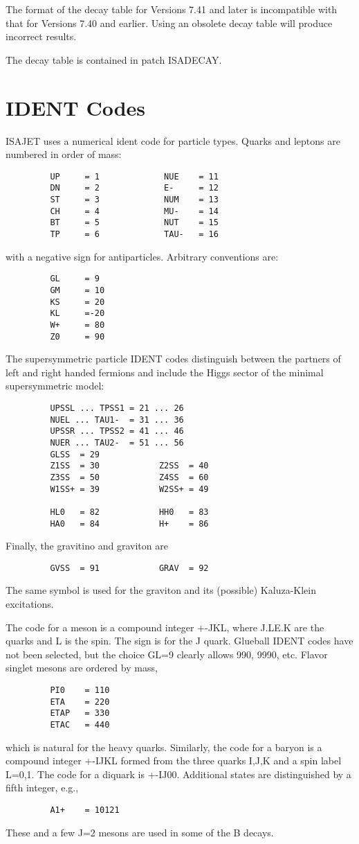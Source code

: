       The format of the decay table for Versions 7.41 and later is
incompatible with that for Versions 7.40 and earlier. Using an
obsolete decay table will produce incorrect results.

      The decay table is contained in patch ISADECAY.
\newpage
\section{IDENT Codes\label{IDENT}}

      ISAJET uses a numerical ident code for particle types. Quarks
and leptons are numbered in order of mass:
\begin{verbatim}
         UP     = 1             NUE    = 11
         DN     = 2             E-     = 12
         ST     = 3             NUM    = 13
         CH     = 4             MU-    = 14
         BT     = 5             NUT    = 15
         TP     = 6             TAU-   = 16
\end{verbatim}
with a negative sign for antiparticles. Arbitrary conventions are:
\begin{verbatim}
         GL     = 9
         GM     = 10
         KS     = 20
         KL     =-20
         W+     = 80
         Z0     = 90
\end{verbatim}
The supersymmetric particle IDENT codes distinguish between the
partners of left and right handed fermions and include the Higgs
sector of the minimal supersymmetric model:
\begin{verbatim}
         UPSSL ... TPSS1 = 21 ... 26
         NUEL ... TAU1-  = 31 ... 36
         UPSSR ... TPSS2 = 41 ... 46
         NUER ... TAU2-  = 51 ... 56
         GLSS  = 29
         Z1SS  = 30            Z2SS  = 40
         Z3SS  = 50            Z4SS  = 60
         W1SS+ = 39            W2SS+ = 49

         HL0   = 82            HH0   = 83
         HA0   = 84            H+    = 86
\end{verbatim}
Finally, the gravitino and graviton are
\begin{verbatim}
         GVSS  = 91            GRAV  = 92
\end{verbatim}
The same symbol is used for the graviton and its (possible) Kaluza-Klein
excitations.

      The code for a meson is a compound integer +-JKL, where J.LE.K are
the quarks and L is the spin. The sign is for the J quark. Glueball
IDENT codes have not been selected, but the choice GL=9 clearly allows
990, 9990, etc. Flavor singlet mesons are ordered by mass,
\begin{verbatim}
         PI0    = 110
         ETA    = 220
         ETAP   = 330
         ETAC   = 440
\end{verbatim}
which is natural for the heavy quarks. Similarly, the code for a
baryon is a compound integer +-IJKL formed from the three quarks I,J,K
and a spin label L=0,1. The code for a diquark is +-IJ00. Additional
states are distinguished by a fifth integer, e.g., 
\begin{verbatim}
         A1+    = 10121
\end{verbatim}
These and a few J=2 mesons are used in some of the B decays.

